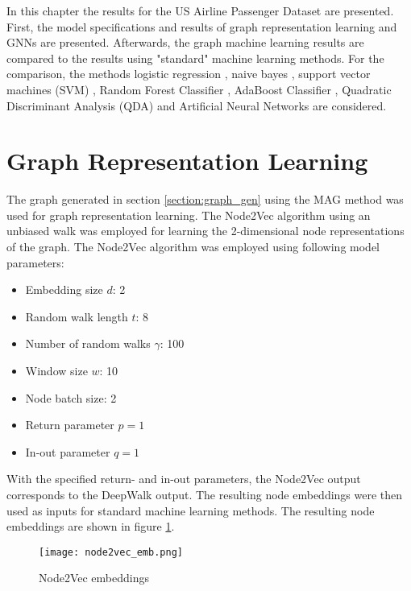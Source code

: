  
  In this chapter the results for the US Airline Passenger Dataset are
  presented. First, the model specifications and results of graph
  representation learning and GNNs are presented. Afterwards, the graph machine
  learning results are compared to the results using "standard" machine
  learning methods. For the comparison, the methods logistic
  regression \citep{cramer2002origins}, naive bayes \citep{zhang2004bayes},
  support vector machines (SVM) \citep{platt1999probabilistic,chang2011libsvm},
  Random Forest Classifier \citep{breiman2001random}, AdaBoost Classifier
  \citep{freund1997decision,hastie2009multi}, Quadratic Discriminant Analysis
  (QDA) \citep{tharwat2016linear} and Artificial Neural Networks
  \citep{mcculloch1943logical} are considered.

  \section{Graph Representation Learning}
  \label{section:result_n2v}

  The graph generated in section \ref{section:graph_gen} using the MAG method
  was used for graph representation learning. The Node2Vec algorithm using an
  unbiased walk was employed for learning the 2-dimensional node representations 
  of the graph. The Node2Vec algorithm was employed using following model 
  parameters:

  \begin{itemize}
    \setlength\itemsep{0.1em}
    \item Embedding size $d$: 2
    \item Random walk length $t$: 8
    \item Number of random walks $\gamma$: 100
    \item Window size $w$: 10
    \item Node batch size: 2
    \item Return parameter $p=1$
    \item In-out parameter $q=1$
  \end{itemize}

  \noindent With the specified return- and in-out parameters, the Node2Vec
  output corresponds to the DeepWalk output. The resulting node embeddings were
  then used as inputs for standard machine learning methods. The resulting node 
  embeddings are shown in figure \ref{fig:node2vec}. 

  \begin{figure}[h]
		\centering
		\texttt{[image: node2vec\_emb.png]}
		\caption{Node2Vec embeddings}
        \label{fig:node2vec}
  \end{figure}


